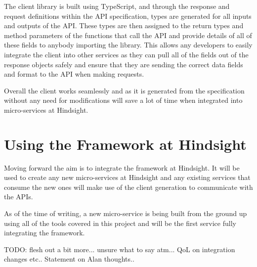 The client library is built using TypeScript, and through the response and request definitions within the API specification, types are generated for all inputs and outputs of the API. These types are then assigned to the return types and method parameters of the functions that call the API and provide details of all of these fields to anybody importing the library. This allows any developers to easily integrate the client into other services as they can pull all of the fields out of the response objects safely and ensure that they are sending the correct data fields and format to the API when making requests.

Overall the client works seamlessly and as it is generated from the specification without any need for modifications will save a lot of time when integrated into micro-services at Hindsight.
\section{Using the Framework at Hindsight}
Moving forward the aim is to integrate the framework at Hindsight. It will be used to create any new micro-services at Hindsight and any existing services that consume the new ones will make use of the client generation to communicate with the APIs.

As of the time of writing, a new micro-service is being built from the ground up using all of the tools covered in this project and will be the first service fully integrating the framework.

TODO: flesh out a bit more... unsure what to say atm... QoL on integration changes etc.. Statement on Alan thoughts..